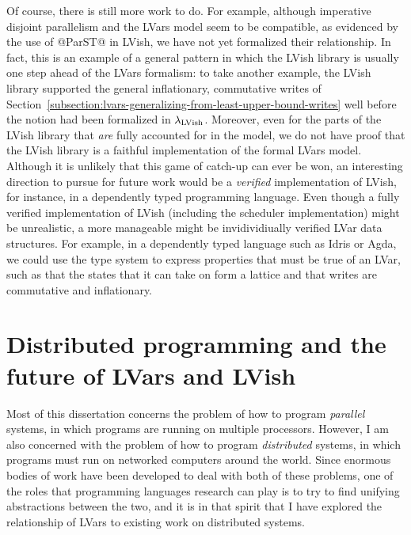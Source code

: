 Of course, there is still more work to do.  For example, although
imperative disjoint parallelism and the LVars model seem to be
compatible, as evidenced by the use of @ParST@ in LVish, we have not
yet formalized their relationship.  In fact, this is an example of a
general pattern in which the LVish library is usually one step ahead
of the LVars formalism: to take another example, the LVish library
supported the general inflationary, commutative writes of
Section~\ref{subsection:lvars-generalizing-from-least-upper-bound-writes}
well before the notion had been formalized in $\lambda_{\textrm{LVish}}$.
Moreover, even for the parts of the LVish library that \emph{are}
fully accounted for in the model, we do not have proof that the LVish
library is a faithful implementation of the formal LVars model.
Although it is unlikely that this game of catch-up can ever be won, an
interesting direction to pursue for future work would be a
\emph{verified} implementation of LVish, for instance, in a
dependently typed programming language.  Even though a fully verified
implementation of LVish (including the scheduler implementation) might
be unrealistic, a more manageable might be invidividiually verified
LVar data structures.  For example, in a dependently typed language
such as Idris or Agda, we could use the type system to express
properties that must be true of an LVar, such as that the states that
it can take on form a lattice and that writes are commutative and
inflationary.

\section{Distributed programming and the future of LVars and LVish}


Most of this dissertation concerns the problem of how to program
\emph{parallel} systems, in which programs are running on multiple
processors.  However, I am also concerned with the problem of how to
program \emph{distributed} systems, in which programs must run on
networked computers around the world.  Since enormous bodies of work
have been developed to deal with both of these problems, one of the
roles that programming languages research can play is to try to find
unifying abstractions between the two, and it is in that spirit that I
have explored the relationship of LVars to existing work on
distributed systems.

